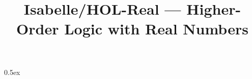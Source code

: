 \documentclass[11pt,a4paper]{article}
\begin{document}
\title{Isabelle/HOL-Real --- Higher-Order Logic with Real Numbers}
\maketitle

\tableofcontents

\parindent 0pt\parskip 0.5ex

\end{document}
